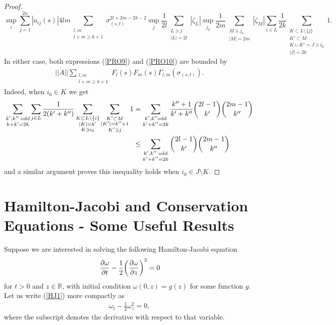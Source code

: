 \documentclass[12pt,twoside]{amsart}
\newcommand{\beq}{\begin{equation}}
\newcommand{\eeq}{\end{equation}}
\numberwithin{equation}{section}
\begin{document}
\begin{appendices}
\begin{proof}
\beq
\sup_{i}\sum_{j=1}^{2n}|\dot{a}_{ij}(s)|4lm \sum_{\substack{l,m \\ l+m \ge k+1}}\sigma_{(s,t)}^{2l+2m-2k-2}\sup_{j}\frac{1}{2l}\sum_{\substack{L\ni j\\|L|=2l}}|\zeta_{L}|\sup_{j_{0}}\frac{1}{2m}\sum_{\substack{M\ni j_{0}\\|M|=2m}}|\zeta_{M}|\sum_{i\in L}\frac{1}{2k}\sum_{\substack{K\subset L\setminus \{j\}\\K'\subset M\\ K\cup K'=J\ni i_{0}\\ |J|=2k}}1. \label{PRO10}
\eeq
In either case, both expressions (\ref{PRO9}) and (\ref{PRO10}) are bounded by 
\begin{eqnarray}
||\dot{A}||\sum_{\substack{l,m \\ l+m\ge k+1}} F_{l}(s)F_{m}(s)\Gamma_{l,m}(\sigma_{(s,t)}). \nonumber
\end{eqnarray}
Indeed, when $i_{0} \in K$ we get
\begin{align}
\sum_{\substack{\textup{$k'$,$k''$ odd}\\ k+k'=2k}}\sum_{j\in L}\frac{1}{2(k'+k'')}\sum_{\substack{K\subset L\setminus\{i\}\\|K|=k'\\ K\ni i_{0}}}\sum_{\substack{K'\subset M\\|K'|=k''+1\\K'\ni j}}1 &= \sum_{\substack{\textup{$k'$,$k''$odd}\\k'+k''=2k}}\frac{k''+1}{k'+k''}\binom{2l-1}{k'}\binom{2m-1}{k''} \nonumber \\
&\le \sum_{\substack{\textup{$k'$,$k''$ odd}\\k'+k''=2k}}\binom{2l-1}{k'}\binom{2m-1}{k''} \nonumber
\end{align}
and a similar argument proves this inequality holds when $i_{0} \in J\setminus K$.  
\end{proof}

\section{Hamilton-Jacobi and Conservation Equations - Some Useful Results}\label{hjconservation}

Suppose we are interested in solving the following Hamilton-Jacobi equation
\begin{eqnarray}
\frac{\partial \omega}{\partial t} -\frac{1}{2}\bigg{(}\frac{\partial \omega}{\partial z}\bigg{)}^{2} = 0 \label{HJ1}
\end{eqnarray}
for $t > 0$ and $z \in \mathbb{R}$, with initial condition $\omega(0,z) = g(z)$ for some function $g$. Let us write (\ref{HJ1}) more compactly as
\begin{eqnarray}
\omega_{t}-\frac{1}{2}\omega_{z}^{2} = 0, \label{HJ2}
\end{eqnarray}
where the subscript denotes the derivative with respect to that variable. 


\end{appendices}
\end{document}
